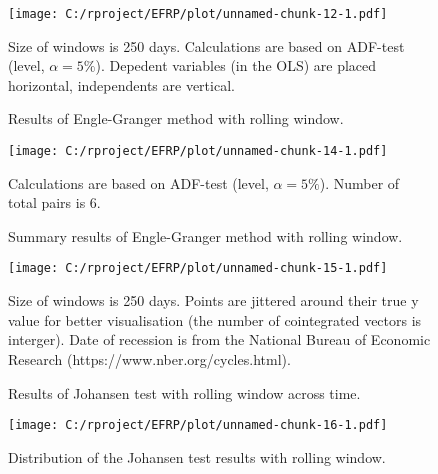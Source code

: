 \documentclass[12pt, a4paper, twoside, titlepage]{article}
\begin{document}
\begin{figure}[ht]
  \centering
  \texttt{[image: C:/rproject/EFRP/plot/unnamed-chunk-12-1.pdf]}
  \caption{Results of Engle-Granger method with rolling window.}
  \label{fig5}
  Size of windows is 250 days. Calculations are based on ADF-test (level, $\alpha = 5\%$). Depedent variables (in the OLS) are placed horizontal, independents are vertical.
\end{figure}

\begin{figure}[ht]
  \centering
  \texttt{[image: C:/rproject/EFRP/plot/unnamed-chunk-14-1.pdf]}
  \caption{Summary results of Engle-Granger method with rolling window.}
  \label{fig6}
  Calculations are based on ADF-test (level, $\alpha = 5\%$). Number of total pairs is 6.
\end{figure}

\begin{figure}[ht]
  \centering
  \texttt{[image: C:/rproject/EFRP/plot/unnamed-chunk-15-1.pdf]}
  \caption{Results of Johansen test with rolling window across time.}
  \label{fig7}
  Size of windows is 250 days. Points are jittered around their true y value for better visualisation (the number of cointegrated vectors is interger). Date of recession is from the National Bureau of Economic Research (https://www.nber.org/cycles.html).
\end{figure}

\begin{figure}[ht]
  \centering
  \texttt{[image: C:/rproject/EFRP/plot/unnamed-chunk-16-1.pdf]}
  \caption{Distribution of the Johansen test results with rolling window.}
  \label{fig8}
\end{figure}

\begin{appendix}
  \listoffigures
  \listoftables
\end{appendix}



\end{document}
